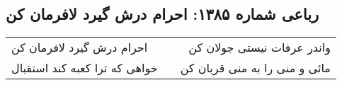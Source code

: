 \begin{center}
\section*{رباعی شماره ۱۳۸۵: احرام درش گیرد لافرمان کن}
\label{sec:1385}
\begin{longtable}{l p{0.5cm} r}
احرام درش گیرد لافرمان کن
&&
واندر عرفات نیستی جولان کن
\\
خواهی که ترا کعبه کند استقبال
&&
مائی و منی را به منی قربان کن
\\
\end{longtable}
\end{center}
